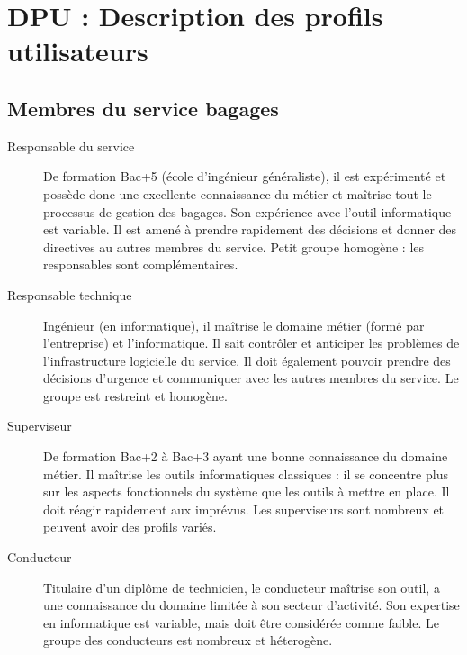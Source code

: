 \documentclass{article}
\begin{document}
\section{DPU : Description des profils utilisateurs}

\subsection{Membres du service bagages}
\begin{description}
\item[Responsable du service] De formation Bac+5 (école d'ingénieur
généraliste), il est expérimenté et possède donc une excellente connaissance du
métier et maîtrise tout le processus de gestion des bagages. Son expérience avec
l'outil informatique est variable. Il est amené à prendre rapidement des
décisions et donner des directives au autres membres du service. Petit groupe
homogène : les responsables sont complémentaires.
\item[Responsable technique] Ingénieur (en informatique), il maîtrise le domaine
métier (formé par l'entreprise) et l'informatique. Il sait contrôler et
anticiper les problèmes de l'infrastructure logicielle du service. Il doit
également pouvoir prendre des décisions d'urgence et communiquer avec les autres
membres du service. Le groupe est restreint et homogène.
\item[Superviseur] De formation Bac+2 à Bac+3 ayant une bonne connaissance du
domaine métier. Il maîtrise les outils informatiques classiques : il se concentre plus
sur les aspects fonctionnels du système que les outils à mettre en place. Il
doit réagir rapidement aux imprévus. Les superviseurs sont nombreux et peuvent
avoir des profils variés.
\item[Conducteur] Titulaire d'un diplôme de technicien, le conducteur maîtrise
son outil, a une connaissance du domaine limitée à son secteur d'activité. Son
expertise en informatique est variable, mais doit être considérée comme faible.
Le groupe des conducteurs est nombreux et héterogène.
\end{description}
\end{document}
